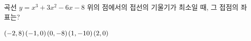 곡선 $y=x^3+3x^2-6x-8$ 위의 점에서의 접선의 기울기가 최소일 때, 그 접점의 좌표는?
\begin{choices32}{$(-2{,}\mkern3mu\mathopen{}8)$}{$(-1{,}\mkern3mu\mathopen{}0)$}{$(0{,}\mkern3mu\mathopen{}-8)$}{$(1{,}\mkern3mu\mathopen{}-10)$}{$(2{,}\mkern3mu\mathopen{}0)$}\end{choices32}
